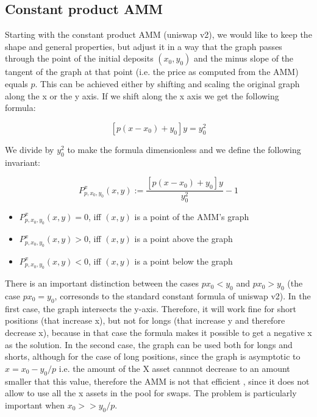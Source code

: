\documentclass{article}
\begin{document}
\subsection{Constant product AMM}
Starting with the constant product AMM (uniswap v2), we would like to keep the shape and general properties, but adjust it in a way that the graph passes through the point of the initial deposits $(x_0,y_0)$ and the minus slope of the tangent of the graph at that point (i.e. the price as computed from the AMM) equals $p$. This can be achieved either by shifting and scaling the original graph along the x or the y axis.
If we shift along the x axis we get the following formula:

\begin{equation}\label{Px invariant}
[p(x-x_0)+y_0]y=y_0^2
\end{equation}

We divide by $y_0^2$ to make the formula dimensionless and we define the following invariant:

\begin{equation}
P^x_{p,x_0,y_0}(x,y) := \frac{[p(x-x_0)+y_0]y}{y_0^2} - 1 
\end{equation}

\begin{itemize}
\item $P^x_{p,x_0,y_0}(x,y) = 0$, iff $(x,y)$ is a point of the AMM's graph
\item $P^x_{p,x_0,y_0}(x,y) > 0$, iff $(x,y)$ is a point above the graph
\item $P^x_{p,x_0,y_0}(x,y) < 0$, iff $(x,y)$ is a point below the graph
\end{itemize}

There is an important distinction between the cases $px_0 < y_0$ and $px_0 > y_0$ (the case $px_0=y_0$, corresonds to the standard constant formula of uniswap v2). In the first case, the graph intersects the y-axis. Therefore, it will work fine for short positions (that increase x), but not for longs (that increase y and therefore decrease x), because in that case the formula makes it possible to get a negative x as the solution. In the second case, the graph can be used both for longs and shorts, although for the case of long positions, since the graph is asymptotic to $x = x_0 - y_0/p$ i.e. the amount of the X asset cannnot decrease to an amount smaller that this value, therefore the AMM is not that efficient , since it does not allow to use all the x assets in the pool for swaps. The problem is particularly important when $x_0 >> y_0/p$.
\end{document}
